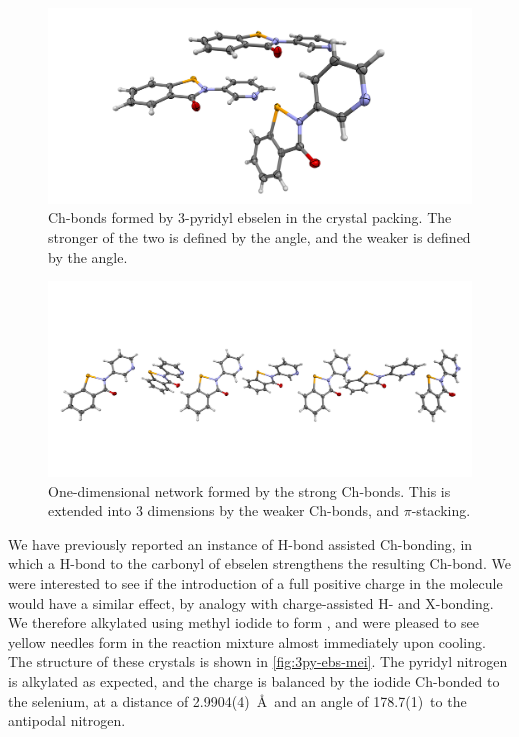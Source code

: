 \begin{refsection}
    \begin{figure}
        \centering
        \includegraphics[width=\linewidth]{Figures/3py-ebs-chbonds.pdf}
        \caption{Ch-bonds formed by 3-pyridyl ebselen  in the crystal packing. The stronger of the two is defined by the  angle, and the weaker is defined by the  angle.}
        \label{fig:3py-ebs-chbonds}
    \end{figure}
    
    \begin{figure}
        \centering
        \includegraphics[width=\linewidth]{Figures/3py-ebs-chain.pdf}
        \caption{One-dimensional network formed by the strong  Ch-bonds. This is extended into 3 dimensions by the weaker  Ch-bonds, and $\pi$-stacking.}
        \label{fig:3py-ebs-chain}
    \end{figure}
    
    We have previously reported an instance of H-bond assisted Ch-bonding, in which a H-bond to the carbonyl of ebselen strengthens the resulting Ch-bond.
    We were interested to see if the introduction of a full positive charge in the molecule would have a similar effect, by analogy with charge-assisted H- and X-bonding.
    We therefore alkylated  using methyl iodide to form , and were pleased to see yellow needles form in the reaction mixture almost immediately upon cooling.
    The structure of these crystals is shown in \cref{fig:3py-ebs-mei}.
    The pyridyl nitrogen is alkylated as expected, and the charge is balanced by the iodide Ch-bonded to the selenium, at a distance of 2.9904(4)~\AA~and an angle of 178.7(1)\degree~to the antipodal nitrogen.
    

\end{refsection}
